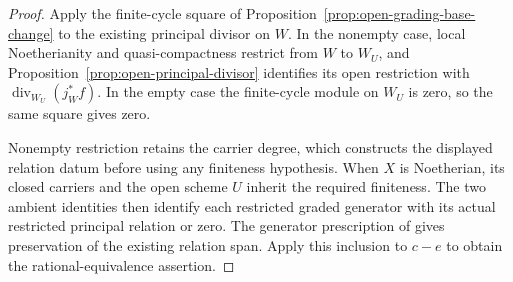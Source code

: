 \documentclass[11pt]{article}
\theoremstyle{definition}
\theoremstyle{remark}
\begin{document}
\begin{proof}
Apply the finite-cycle square of
Proposition~\ref{prop:open-grading-base-change} to the existing
principal divisor on \(W\). In the nonempty case, local
Noetherianity and quasi-compactness restrict from \(W\) to \(W_U\),
and Proposition~\ref{prop:open-principal-divisor} identifies its
open restriction with \(\operatorname{div}_{W_U}(j_W^*f)\).
In the empty case the finite-cycle module on \(W_U\) is zero,
so the same square gives zero.

Nonempty restriction retains the carrier degree, which constructs
the displayed relation datum before using any finiteness hypothesis.
When \(X\) is Noetherian, its closed carriers and the open scheme
\(U\) inherit the required finiteness. The two ambient identities
then identify each restricted graded generator with its actual
restricted principal relation or zero. The generator prescription
of \cite{StacksRationalEquivalence} gives preservation of the
existing relation span. Apply this inclusion to \(c-e\) to obtain
the rational-equivalence assertion.
\end{proof}
\end{document}
